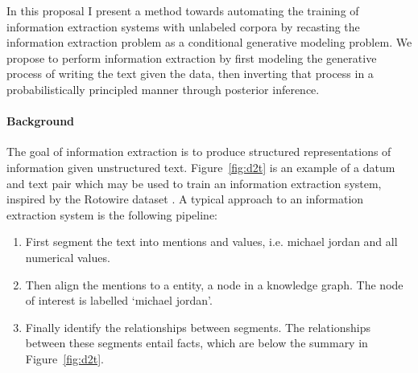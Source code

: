 \documentclass[12pt]{article}
\begin{document}
In this proposal I present a method towards automating the
training of information extraction systems with unlabeled corpora
by recasting the information extraction problem as a conditional generative modeling problem.
We propose to perform information extraction by first modeling the 
generative process of writing the text given the data,
then inverting that process in a probabilistically principled manner
through posterior inference.

\paragraph{Background}
The goal of information extraction is to produce structured representations of information
given unstructured text.
Figure~\ref{fig:d2t} is an example of a datum and text pair which may be used to
train an information extraction system, inspired by the Rotowire dataset \citep{wiseman2017d2t}.
A typical approach to an information extraction system is the following pipeline:
\begin{enumerate}
\item First segment the text into mentions and values, i.e. michael jordan and all numerical values.
\item Then align the mentions to a entity, a node in a knowledge graph.
The node of interest is labelled `michael jordan'.
\item Finally identify the relationships between segments.
The relationships between these segments entail facts, which
are below the summary in Figure~\ref{fig:d2t}.
\end{enumerate}
\end{document}
